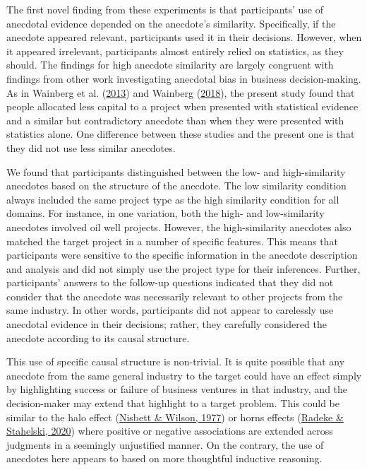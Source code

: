 \documentclass[
  man, donotrepeattitle,floatsintext]{apa7}
\theoremstyle{definition}
\theoremstyle{definition}
\theoremstyle{definition}
\theoremstyle{definition}
\theoremstyle{remark}
\begin{document}
The first novel finding from these experiments is that participants' use of
anecdotal evidence depended on the anecdote's similarity. Specifically, if the
anecdote appeared relevant, participants used it in their decisions. However,
when it appeared irrelevant, participants almost entirely relied on statistics,
as they should. The findings for high anecdote similarity are largely congruent
with findings from other work investigating anecdotal bias in business
decision-making. As in Wainberg et al. (\protect\hyperlink{ref-wainberg2013}{2013}) and Wainberg (\protect\hyperlink{ref-wainberg2018}{2018}), the present study found
that people allocated less capital to a project when presented with statistical
evidence and a similar but contradictory anecdote than when they were presented
with statistics alone. One difference between these studies and the present one
is that they did not use less similar anecdotes.

We found that participants distinguished between the low- and high-similarity
anecdotes based on the structure of the anecdote. The low similarity condition
always included the same project type as the high similarity condition for all
domains. For instance, in one variation, both the high- and low-similarity
anecdotes involved oil well projects. However, the high-similarity anecdotes
also matched the target project in a number of specific features. This means
that participants were sensitive to the specific information in the anecdote
description and analysis and did not simply use the project type for their
inferences. Further, participants' answers to the follow-up questions indicated
that they did not consider that the anecdote was necessarily relevant to other
projects from the same industry. In other words, participants did not appear to
carelessly use anecdotal evidence in their decisions; rather, they carefully
considered the anecdote according to its causal structure.

This use of specific causal structure is non-trivial. It is quite possible that
any anecdote from the same general industry to the target could have an effect
simply by highlighting success or failure of business ventures in that industry,
and the decision-maker may extend that highlight to a target problem. This could
be similar to the halo effect (\protect\hyperlink{ref-nisbett1977}{Nisbett \& Wilson, 1977}) or horns effects (\protect\hyperlink{ref-radeke2020}{Radeke \& Stahelski, 2020})
where positive or negative associations are extended across judgments in a
seemingly unjustified manner. On the contrary, the use of anecdotes here appears
to based on more thoughtful inductive reasoning.
\end{document}
